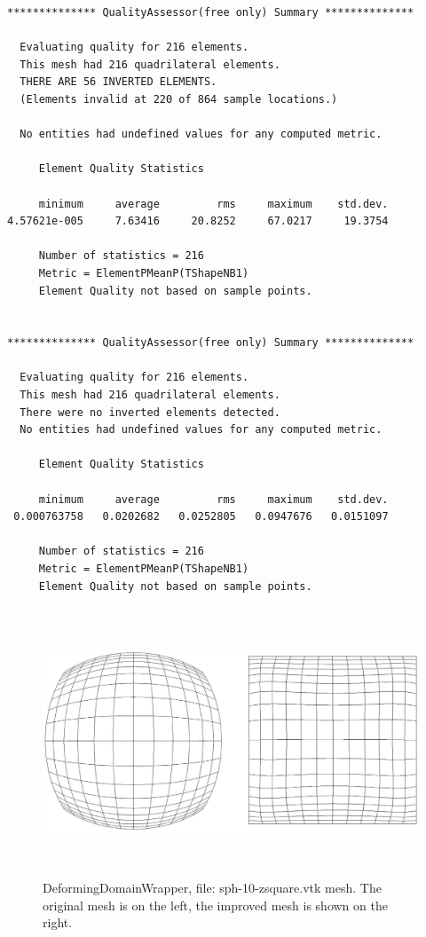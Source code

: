 \begin{verbatim}
************** QualityAssessor(free only) Summary **************

  Evaluating quality for 216 elements.
  This mesh had 216 quadrilateral elements.
  THERE ARE 56 INVERTED ELEMENTS.
  (Elements invalid at 220 of 864 sample locations.)

  No entities had undefined values for any computed metric.

     Element Quality Statistics

     minimum     average         rms     maximum    std.dev.
4.57621e-005     7.63416     20.8252     67.0217     19.3754

     Number of statistics = 216
     Metric = ElementPMeanP(TShapeNB1)
     Element Quality not based on sample points.


************** QualityAssessor(free only) Summary **************

  Evaluating quality for 216 elements.
  This mesh had 216 quadrilateral elements.
  There were no inverted elements detected.
  No entities had undefined values for any computed metric.

     Element Quality Statistics

     minimum     average         rms     maximum    std.dev.
 0.000763758   0.0202682   0.0252805   0.0947676   0.0151097

     Number of statistics = 216
     Metric = ElementPMeanP(TShapeNB1)
     Element Quality not based on sample points.
\end{verbatim}


\begin{figure}[htbp]
\begin{center}
    \includegraphics[height=80mm]{sph-10-zsquare.eps}
    \caption{DeformingDomainWrapper, file: sph-10-zsquare.vtk mesh. The original mesh is on the left, the improved mesh is shown on the right.}
    \label{fig:sph-10-zsquare}
\end{center}
\end{figure}
